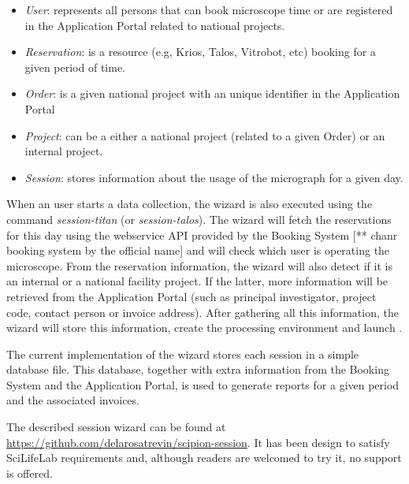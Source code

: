 \begin{itemize}
\setlength\itemsep{0em}
 \item \textit{User}: represents all persons that can book microscope time or are registered in the Application Portal 
 related to national projects.
 \item \textit{Reservation}:  is a resource (e.g, Krios, Talos, Vitrobot, etc) booking for a given period of time.
 \item \textit{Order}:  is a given national project with an unique identifier in the Application Portal
 \item \textit{Project}:  can be a either a national project (related to a given Order) or an internal project.
 \item \textit{Session}:  stores information about the usage of the micrograph for a given day.
\end{itemize}

When an user starts a data collection, the wizard is also executed using the command \textit{session-titan} (or \textit{session-talos}). The wizard will fetch the reservations for this day using the webservice API provided by the Booking System [** chanr booking system by the official name] and will check which user is operating the microscope. From the reservation information, the wizard will also detect if it is an internal or a national facility project. If the latter, more information will be retrieved from the Application Portal (such as principal investigator, project code, contact person or invoice address). After gathering all this information, the wizard will store this information, create the processing environment and launch \scipion. %

The current implementation of the wizard stores each session in a simple database file. This database, together with extra information from the Booking System and the Application Portal, is used to generate reports for a given period and the associated invoices. %

The described session wizard can be found at  \url{https://github.com/delarosatrevin/scipion-session}. It has been design to satisfy SciLifeLab requirements and, although readers are welcomed to try it, no support is offered.




